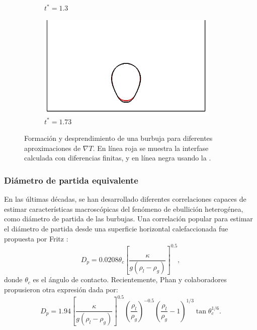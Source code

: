 \begin{figure}[htb]
\begin{subfigure}[t]{0.45\textwidth}
        \caption{$t^*=1.3$}
    \end{subfigure}    
    \begin{subfigure}[t]{0.45\textwidth}
        \centering
        \includegraphics[width=0.95\textwidth]{Imagenes/HetBoiling/gradT/60}
        \caption{$t^*=1.73$}
    \end{subfigure}        
    \caption{Formaci\'on y desprendimiento de una burbuja para diferentes aproximaciones de $\nabla T$. En l\'inea roja se muestra la interfase calculada con diferencias finitas, y en l\'inea negra usando la .}
    \label{fig:bubble2D_gradT}
\end{figure}



\subsubsection{Di\'ametro de partida equivalente}

En las \'ultimas d\'ecadas, se han desarrollado diferentes correlaciones capaces de estimar caracter\'isticas macrosc\'opicas del fen\'omeno de ebullici\'on heterog\'enea, como di\'ametro de partida de las burbujas. Una correlaci\'on popular para estimar el di\'ametro de partida desde una superficie horizontal calefaccionada fue propuesta por Fritz \cite{fritz_berechnung_1935}:
\begin{equation}
	D_p = 0.0208 \theta_c \left[ \dfrac{\kappa}{g(\rho_l-\rho_g)} \right]^{0.5},
	\label{eq:g_fritz}
\end{equation}
donde $\theta_c$ es el \'angulo de contacto. Recientemente, Phan y colaboradores propusieron otra expresi\'on dada por:
\begin{equation}
	D_p = 1.94 \left[ \dfrac{\kappa}{g(\rho_l-\rho_g)} \right]^{0.5} \left( \dfrac{\rho_l}{\rho_g} \right)^{-0.5} \left( \dfrac{\rho_l}{\rho_g} -1\right)^{1/3} \tan\theta_c^{1/6}.
	\label{eq:g_phan}
\end{equation}

